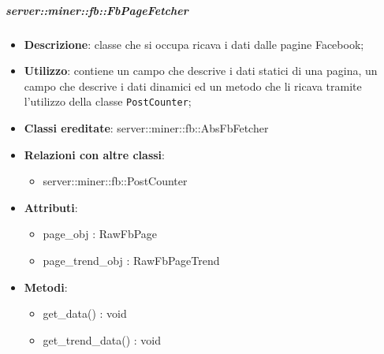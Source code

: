 		\subparagraph{server::miner::fb::FbPageFetcher} %
		\label{subp:server_miner_fb_FbPageFetcher}
			\begin{itemize}
				\item \textbf{Descrizione}: classe che si occupa ricava i dati dalle pagine Facebook;
				\item \textbf{Utilizzo}: contiene un campo che descrive i dati statici di una pagina, un campo che descrive i dati dinamici ed un metodo che li ricava tramite l'utilizzo della classe \texttt{PostCounter};
				\item \textbf{Classi ereditate}: server::miner::fb::AbsFbFetcher
				\item \textbf{Relazioni con altre classi}:
					\begin{itemize}
						\item server::miner::fb::PostCounter
					\end{itemize}
				\item \textbf{Attributi}: 
					\begin{itemize}
						\item page\_obj : RawFbPage
						\item page\_trend\_obj : RawFbPageTrend
					\end{itemize}
				\item \textbf{Metodi}:   
					\begin{itemize}
						\item get\_data() : void
						\item get\_trend\_data() : void
					\end{itemize}
			\end{itemize}

